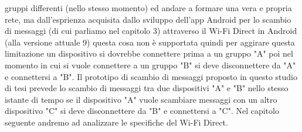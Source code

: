     gruppi differenti (nello stesso momento) ed andare a formare una
    vera e propria rete,
    ma dall'esprienza acquisita dallo sviluppo dell'app Android per lo scambio di messaggi 
    (di cui parliamo nel capitolo 3) attraverso il Wi-Fi Direct 
    in Android (alla versione attuale 9) questa cosa non è supportata
    quindi per aggirare questa limitazione un dispositivo si dovrebbe
    connettere prima a un gruppo "A" poi nel momento in cui si vuole
    connettere a un gruppo "B"
    si deve disconnettere da "A" e connettersi a "B".
    Il prototipo di scambio di messaggi proposto in questo studio di
    tesi prevede lo scambio di messaggi tra due dispositivi "A" e "B"
    nello stesso istante di
    tempo se il dispositivo "A" vuole scambiare messaggi con un altro dispositivo "C"
    si deve disconnettere da "B" e connettersi a "C".
    Nel capitolo seguente andremo ad analizzare le specifiche del Wi-Fi Direct.


